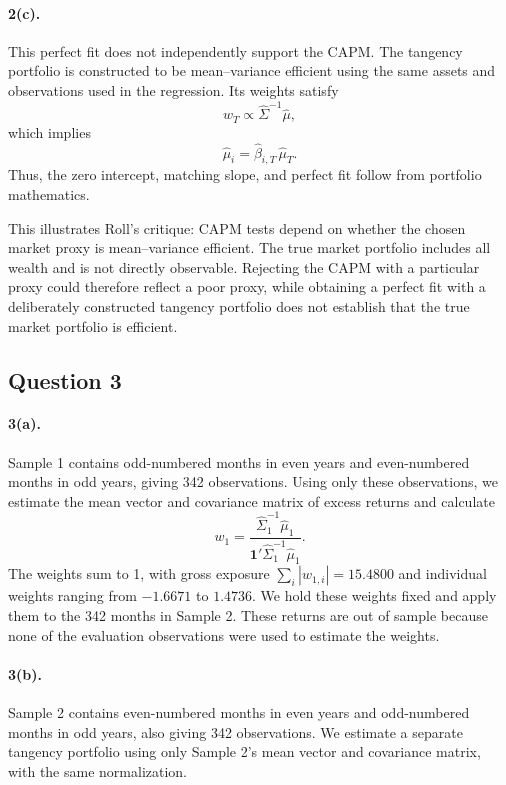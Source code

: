\paragraph{2(c).} This perfect fit does not independently support the CAPM. The
tangency portfolio is constructed to be mean--variance efficient using the same
assets and observations used in the regression. Its weights satisfy
\[
w_T \propto \hat\Sigma^{-1}\hat\mu,
\]
which implies
\[
\hat\mu_i = \hat\beta_{i,T}\,\hat\mu_T .
\]
Thus, the zero intercept, matching slope, and perfect fit follow from portfolio
mathematics.

This illustrates Roll's critique: CAPM tests depend on whether the chosen
market proxy is mean--variance efficient. The true market portfolio includes
all wealth and is not directly observable. Rejecting the CAPM with a particular
proxy could therefore reflect a poor proxy, while obtaining a perfect fit with
a deliberately constructed tangency portfolio does not establish that the true
market portfolio is efficient.

\subsection{Question 3}

\paragraph{3(a).} Sample 1 contains odd-numbered months in even years and
even-numbered months in odd years, giving 342 observations. Using only these
observations, we estimate the mean vector and covariance matrix of excess
returns and calculate
\[
w_1 = \frac{\hat\Sigma_1^{-1}\hat\mu_1}{\mathbf{1}'\hat\Sigma_1^{-1}\hat\mu_1}.
\]
The weights sum to 1, with gross exposure $\sum_i |w_{1,i}| = 15.4800$ and
individual weights ranging from $-1.6671$ to $1.4736$. We hold these weights
fixed and apply them to the 342 months in Sample 2. These returns are out of
sample because none of the evaluation observations were used to estimate the
weights.

\paragraph{3(b).} Sample 2 contains even-numbered months in even years and
odd-numbered months in odd years, also giving 342 observations. We estimate a
separate tangency portfolio using only Sample 2's mean vector and covariance
matrix, with the same normalization.

